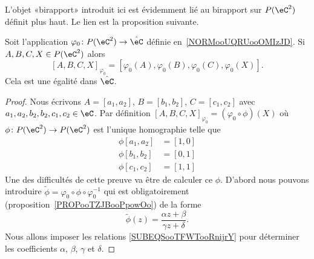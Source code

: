 L'objet «birapport» introduit ici est évidemment lié au birapport sur \( P(\eC^2)\) définit plus haut. Le lien est la proposition suivante.

\begin{proposition}     \label{PROPooLKQQooEOrjwC}
	Soit l'application \( \varphi_0\colon P(\eC^2)\to \hat\eC\) définie en~\ref{NORMooUQRUooOMIzJD}. Si \( A,B,C,X\in P(\eC^2) \) alors
	\begin{equation}        \label{EQooEOZZooMRHJfH}
		[A,B,C,X]_{\varphi_0}=[\varphi_0(A),\varphi_0(B),\varphi_0(C),\varphi_0(X)].
	\end{equation}
	Cela est une égalité dans \( \hat \eC\).
\end{proposition}

\begin{proof}
	Nous écrivons \( A=[a_1,a_2]\), \( B=[b_1,b_2]\), \( C=[c_1,c_2]\) avec \( a_1,a_2,b_2,b_2,c_1,c_2\in \eC\). Par définition \( [A,B,C,X]_{\varphi_0}=(\varphi_0\circ\phi)(X)\) où \( \phi\colon P(\eC^2)\to P(\eC^2)\) est l'unique homographie telle que
	\begin{subequations}        \label{SUBEQSooTFWTooRnijrY}
		\begin{align}
			\phi[a_1,a_2] & =[1,0] \\
			\phi[b_1,b_2] & =[0,1] \\
			\phi[c_1,c_2] & =[1,1]
		\end{align}
	\end{subequations}
	Une des difficultés de cette preuve va être de calculer ce \( \phi\). D'abord nous pouvons introduire \( \tilde \phi=\varphi_0\circ\phi\circ\varphi_0^{-1}\) qui est obligatoirement (proposition~\ref{PROPooTZJBooPpowOo}) de la forme
	\begin{equation}
		\tilde \phi(z)=\frac{ \alpha z+\beta }{ \gamma z+\delta }.
	\end{equation}
	Nous allons imposer les relations \eqref{SUBEQSooTFWTooRnijrY} pour déterminer les coefficients \( \alpha\), \( \beta\), \( \gamma\) et \( \delta\).


\end{proof}
